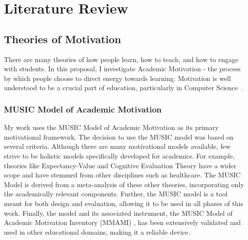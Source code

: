 \section{Literature Review}

\subsection{Theories of Motivation}

There are many theories of how people learn, how to teach, and how to engage with students. 
In this proposal, I investigate Academic Motivation - the process by which people choose to direct energy towards learning.
Motivation is well understood to be a crucial part of education, particularly in Computer Science~\cite{Carter:2011}.

\subsubsection{MUSIC Model of Academic Motivation}

My work uses the MUSIC Model of Academic Motivation as its primary motivational framework.
The decision to use the MUSIC model was based on several criteria.
Although there are many motivational models available, few strive to be holistic models specifically developed for academics.
For example, theories like Expectancy-Value and Cognitive Evaluation Theory have a wider scope and have stemmed from other disciplines such as healthcare. %
The MUSIC Model is derived from a meta-analysis of these other theories, incorporating only the academically relevant components.
Further, the MUSIC model is a tool meant for both design and evaluation, allowing it to be used in all phases of this work.
Finally, the model and its associated instrument, the MUSIC Model of Academic Motivation Inventory (MMAMI) , has been extensively validated and used in other educational domains, making it a reliable device\cite{jones-validity}.

